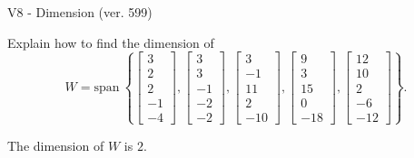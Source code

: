 \begin{exercise}
  \begin{exerciseTitle}V8 - Dimension (ver. 599)\end{exerciseTitle}
  \begin{exerciseStatement}
    Explain how to find the dimension of 
\[W=\mathrm{span}\ \left\{\left[\begin{array}{r}
3 \\
2 \\
2 \\
-1 \\
-4
\end{array}\right] , \left[\begin{array}{r}
3 \\
3 \\
-1 \\
-2 \\
-2
\end{array}\right] , \left[\begin{array}{r}
3 \\
-1 \\
11 \\
2 \\
-10
\end{array}\right] , \left[\begin{array}{r}
9 \\
3 \\
15 \\
0 \\
-18
\end{array}\right] , \left[\begin{array}{r}
12 \\
10 \\
2 \\
-6 \\
-12
\end{array}\right]\right\}.\]



  \end{exerciseStatement}
  \begin{exerciseAnswer}
   The dimension of \(W\) is  \(2\).
  


  \end{exerciseAnswer}
\end{exercise}